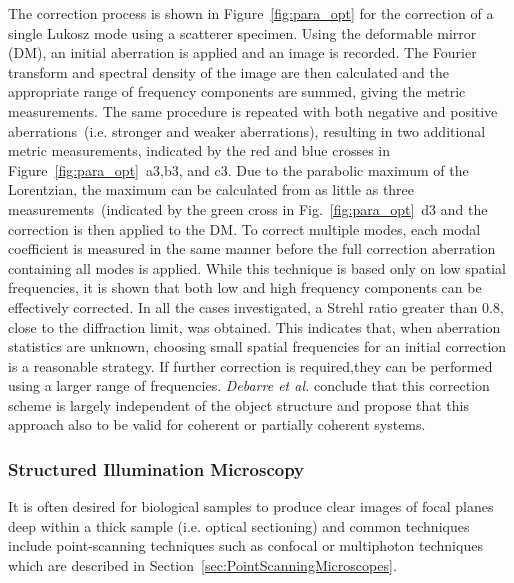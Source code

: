 The correction process is shown in Figure~\ref{fig:para_opt} for the correction of a single Lukosz mode using a scatterer specimen. Using the deformable mirror (DM), an initial aberration is applied and an image is recorded. The Fourier transform and spectral density of the image are then calculated and the appropriate range of frequency components are summed, giving the metric measurements. The same procedure is repeated with both negative and positive aberrations~(i.e. stronger and weaker aberrations), resulting in two additional metric measurements, indicated by the red and blue crosses in Figure~\ref{fig:para_opt}~a3,b3, and c3. Due to the parabolic maximum of the Lorentzian, the maximum can be calculated from as little as three measurements~(indicated by the green cross in Fig.~\ref{fig:para_opt}~d3 and the correction is then applied to the DM. To correct multiple modes, each modal coefficient is measured in the same manner before the full correction aberration containing all modes is applied. While this technique is based only on low spatial frequencies, it is shown that both low and high frequency components can be effectively corrected. In all the cases investigated, a Strehl ratio greater than 0.8, close to the diffraction limit, was obtained. This indicates that, when aberration statistics are unknown, choosing small spatial frequencies for an initial correction is a reasonable strategy. If further correction is required,they can be performed using a larger range of frequencies. \emph{Debarre et al.} conclude that this correction scheme is largely independent of the object structure and propose that this approach also to be valid for coherent or partially coherent systems.

\subsubsection{Structured Illumination Microscopy}
\label{sec:StructuredIlluminationMicroscopy}

It is often desired for biological samples to produce clear images of focal planes deep within a thick sample (i.e. optical sectioning) and common techniques include point-scanning techniques such as confocal or multiphoton techniques which are described in Section~\ref{sec:PointScanningMicroscopes}. 

